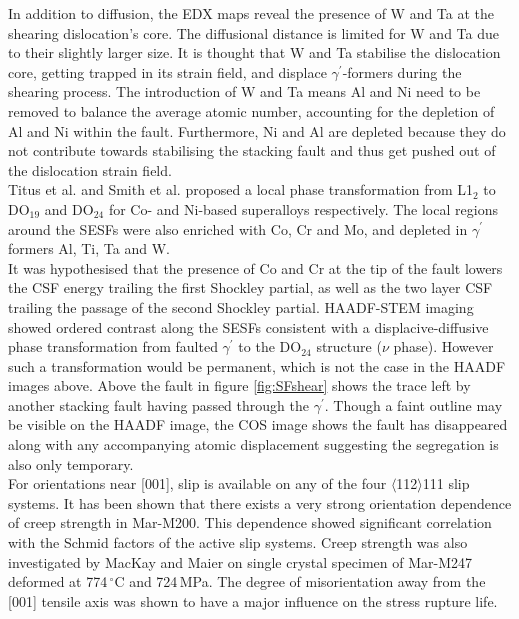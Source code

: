 \documentclass[a4paper,12pt,times,numbered,print,index]{Classes/PhDThesisPSnPDF}
\begin{document}
In addition to diffusion, the EDX maps reveal the presence of W and Ta at the shearing dislocation's core. The diffusional distance is limited for W and Ta due to their slightly larger size. It is thought that W and Ta stabilise the dislocation core, getting trapped in its strain field, and displace $\gamma^{\prime}$-formers during the shearing process. The introduction of W and Ta means Al and Ni need to be removed to balance the average atomic number, accounting for the depletion of Al and Ni within the fault. Furthermore, Ni and Al are depleted because they do not contribute towards stabilising the stacking fault and thus get pushed out of the dislocation strain field.\\
Titus et al. and Smith et al. proposed a local phase transformation from L1$_{2}$ to DO$_{19}$ and DO$_{24}$ for Co- and Ni-based superalloys respectively.\citep{} The local regions around the SESFs were also enriched with Co, Cr and Mo, and depleted in $\gamma^{\prime}$ formers Al, Ti, Ta and W.\\
It was hypothesised that the presence of Co and Cr at the tip of the fault lowers the CSF energy trailing the first Shockley partial, as well as the two layer CSF trailing the passage of the second Shockley partial. HAADF-STEM imaging showed ordered contrast along the SESFs consistent with a displacive-diffusive phase transformation from faulted $\gamma^{\prime}$ to the DO$_{24}$ structure ($\nu$ phase). However such a transformation would be permanent, which is not the case in the HAADF images above. Above the fault in figure \ref{fig:SFshear} shows the trace left by another stacking fault having passed through the $\gamma^{\prime}$. Though a faint outline may be visible on the HAADF image, the COS image shows the fault has disappeared along with any accompanying atomic displacement suggesting the segregation is also only temporary.\\
For orientations near [001], slip is available on any of the four $\langle$112$\rangle${111} slip systems. It has been shown that there exists a very strong orientation dependence of creep strength in Mar-M200.\cite{COPLEY197287} This dependence showed significant correlation with the Schmid factors of the active slip systems.
Creep strength was also investigated by MacKay and Maier on single crystal specimen of Mar-M247 deformed at 774\,$^\circ$C and 724\,MPa.\cite{MacKay:1982gd} The degree of misorientation away from the [001] tensile axis was shown to have a major influence on the stress rupture life.
\end{document}
